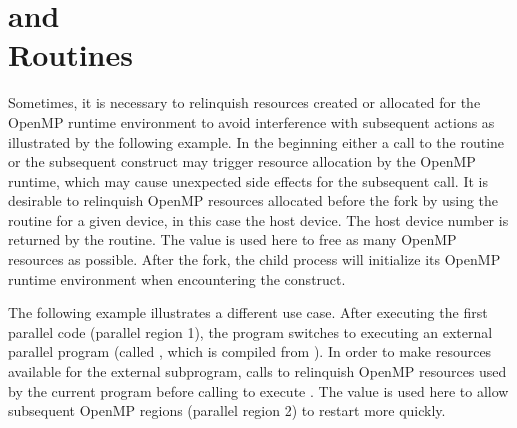 \section{ and \\
   Routines}
\label{sec:pause_resource}

Sometimes, it is necessary to relinquish resources created or allocated
for the OpenMP runtime environment to avoid interference with subsequent
actions as illustrated by the following example.  In the beginning 
either a call to the  routine 
or the subsequent  construct may trigger resource allocation
by the OpenMP runtime, which may cause unexpected side effects 
for the subsequent  call.
It is desirable to relinquish OpenMP resources allocated before 
the fork by using the  routine for a given
device, in this case the host device.  The host device number is returned by 
the  routine.
The  value is used here to free as many
OpenMP resources as possible.
After the fork, the child process will initialize its OpenMP runtime
environment when encountering the  construct.


The following example illustrates a different use case. 
After executing the first parallel code (parallel region 1), 
the  program switches to executing an external parallel program
(called , which is compiled from ).  
In order to make resources available for the external
subprogram,  calls 
to relinquish OpenMP resources used by the current program before
calling  to execute .
The  value is used here to allow subsequent
OpenMP regions (parallel region 2) to restart more quickly.


